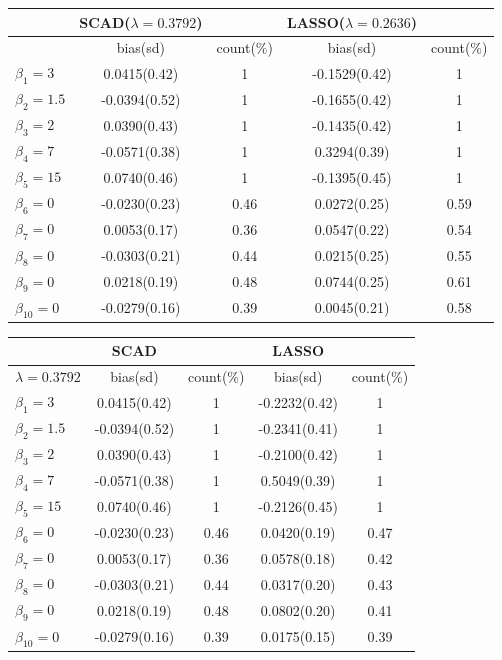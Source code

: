 \documentclass{beamer}
\begin{document}
\begin{frame}
\fontsize{7.5pt}{12pt}
\begin{tabular}[t]{|l|c|c|c|c|}
	\hline
	& SCAD($\lambda = 0.3792$)       &       & LASSO($\lambda = 0.2636$)      & \\  
	\hline
	& bias(sd)    & count(\%) & bias(sd)     & count(\%) \\
	\hline  
	$\beta_1=3$ & 0.0415(0.42)&    1  & -0.1529(0.42)  & 1\\
	$\beta_2=1.5$ &-0.0394(0.52) & 1     &-0.1655(0.42)   & 1\\
	$\beta_3=2$ & 0.0390(0.43) & 1     &-0.1435(0.42)   &1\\
	$\beta_4=7$ &-0.0571(0.38) & 1     &0.3294(0.39)  &1\\
	$\beta_5=15$&0.0740(0.46) & 1      &-0.1395(0.45)  &1\\
	$\beta_6=0$&-0.0230(0.23) & 0.46     &0.0272(0.25)  &0.59\\ 
	$\beta_7=0$&0.0053(0.17) & 0.36 	  &0.0547(0.22)  &0.54\\     	                  
	$\beta_8=0$&-0.0303(0.21) & 0.44	  &0.0215(0.25)  &0.55\\
	$\beta_9=0$&0.0218(0.19) & 0.48 	  &0.0744(0.25)  &0.61\\
	$\beta_{10}=0$&-0.0279(0.16) & 0.39 	  &0.0045(0.21)  &0.58\\
	
	\hline
\end{tabular}
\end{frame}     

\begin{frame}
\fontsize{10pt}{14pt}
\begin{tabular}[t]{|l|c|c|c|c|}
	\hline
                     	& SCAD       &       & LASSO      & \\  
	\hline
	$\lambda=0.3792$ & bias(sd)    & count(\%) & bias(sd)     & count(\%) \\
	\hline  
	$\beta_1=3$ & 0.0415(0.42)&    1  & -0.2232(0.42)  & 1\\
	$\beta_2=1.5$ &-0.0394(0.52) & 1     &-0.2341(0.41)   & 1\\
	$\beta_3=2$ & 0.0390(0.43) & 1     &-0.2100(0.42)   &1\\
	$\beta_4=7$ &-0.0571(0.38) & 1     &0.5049(0.39)  &1\\
	$\beta_5=15$&0.0740(0.46) & 1      &-0.2126(0.45)  &1\\
	$\beta_6=0$&-0.0230(0.23) & 0.46     &0.0420(0.19)  &0.47\\ 
	$\beta_7=0$&0.0053(0.17) & 0.36 	  &0.0578(0.18)  &0.42\\     	                  
	$\beta_8=0$&-0.0303(0.21) & 0.44 	  &0.0317(0.20)  &0.43\\
	$\beta_9=0$&0.0218(0.19) & 0.48 	  &0.0802(0.20)  &0.41\\
	$\beta_{10}=0$&-0.0279(0.16) & 0.39 	  &0.0175(0.15)  &0.39\\

	\hline
\end{tabular}
\end{frame}     
    
\end{document}
